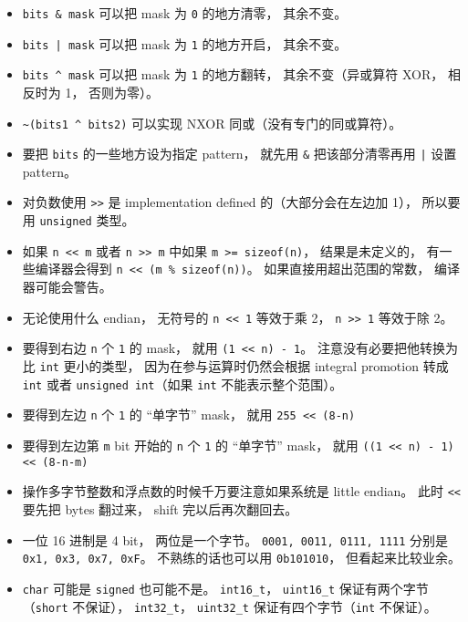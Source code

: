 
\begin{issues}
\issueDraft
\end{issues}

\begin{itemize}
\item \verb|bits & mask| 可以把 mask 为 \verb|0| 的地方清零， 其余不变。
\item \verb`bits | mask` 可以把 mask 为 \verb|1| 的地方开启， 其余不变。
\item \verb|bits ^ mask| 可以把 mask 为 \verb|1| 的地方翻转， 其余不变（异或算符 XOR， 相反时为 1， 否则为零）。
\item \verb|~(bits1 ^ bits2)| 可以实现 NXOR 同或（没有专门的同或算符）。
\item 要把 \verb|bits| 的一些地方设为指定 pattern， 就先用 \verb|&| 把该部分清零再用 \verb`|` 设置 pattern。
\item 对负数使用 \verb|>>| 是 implementation defined 的（大部分会在左边加 1）， 所以要用 \verb|unsigned| 类型。
\item 如果 \verb|n << m| 或者 \verb|n >> m| 中如果 \verb|m >= sizeof(n)|， 结果是未定义的， 有一些编译器会得到 \verb|n << (m % sizeof(n))|。 如果直接用超出范围的常数， 编译器可能会警告。
\item 无论使用什么 endian， 无符号的 \verb|n << 1| 等效于乘 2， \verb|n >> 1| 等效于除 2。
\item 要得到右边 \verb|n| 个 \verb|1| 的 mask， 就用 \verb|(1 << n) - 1|。 注意没有必要把他转换为比 \verb|int| 更小的类型， 因为在参与运算时仍然会根据 integral promotion 转成 \verb|int| 或者 \verb|unsigned int|（如果 \verb|int| 不能表示整个范围）。
\item 要得到左边 \verb|n| 个 \verb|1| 的 “单字节” mask， 就用 \verb|255 << (8-n)|
\item 要得到左边第 \verb|m| bit 开始的 \verb|n| 个 \verb|1| 的 “单字节” mask， 就用 \verb|((1 << n) - 1) << (8-n-m)|
\item 操作多字节整数和浮点数的时候千万要注意如果系统是 little endian。 此时 \verb|<<| 要先把 bytes 翻过来， shift 完以后再次翻回去。
\item 一位 16 进制是 4 bit， 两位是一个字节。 \verb|0001, 0011, 0111, 1111| 分别是 \verb|0x1, 0x3, 0x7, 0xF|。 不熟练的话也可以用 \verb|0b101010|， 但看起来比较业余。
\item \verb|char| 可能是 \verb|signed| 也可能不是。 \verb|int16_t|， \verb|uint16_t| 保证有两个字节（\verb|short| 不保证）， \verb|int32_t|， \verb|uint32_t| 保证有四个字节（\verb|int| 不保证）。
\end{itemize}
